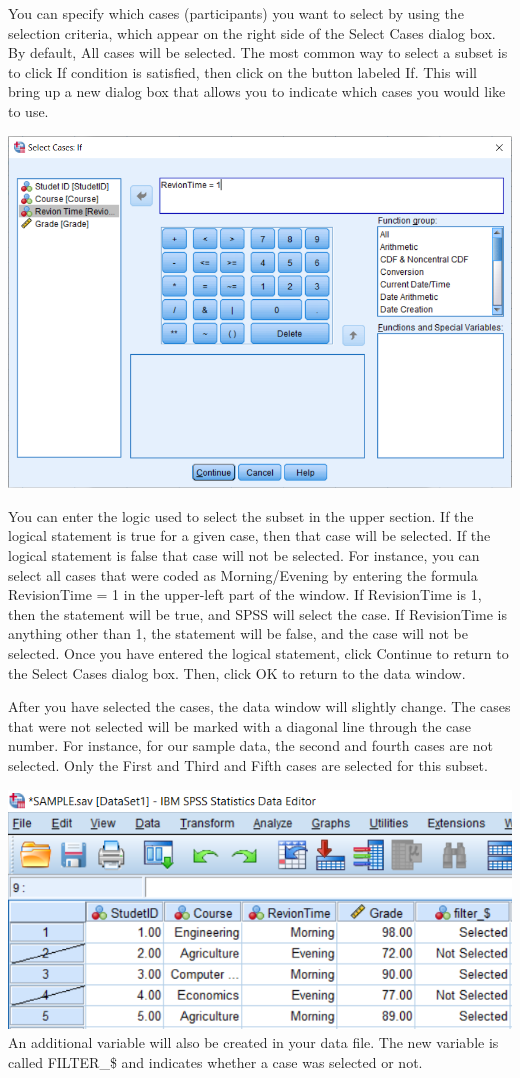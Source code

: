 \documentclass[
]{book}
\begin{document}
You can specify which cases (participants) you want to select by using the selection criteria, which appear on the right side of the Select Cases dialog box. By default, All cases will be selected. The most common way to select a subset is to click If condition is satisfied, then click on the button labeled If. This will bring up a new dialog box that allows you to indicate which cases you would like to use.

\includegraphics{SelectCases3.png}

You can enter the logic used to select the subset in the upper section. If the logical statement is true for a given case, then that case will be selected. If the logical statement is false that case will not be selected. For instance, you can select all cases that were coded as Morning/Evening by entering the formula RevisionTime = 1 in the upper-left part of the window. If RevisionTime is 1, then the statement will be true, and SPSS will select the case. If RevisionTime is anything other than 1, the statement will be false, and the case will not be selected. Once you have entered the logical statement, click Continue to return to the Select Cases dialog box. Then, click OK to return to the data window.

After you have selected the cases, the data window will slightly change. The cases that were not selected will be marked with a diagonal line through the case number. For instance, for our sample data, the second and fourth cases are not selected. Only the First and Third and Fifth cases are selected for this subset.

\includegraphics{Exclude1.png}
An additional variable will also be created in your data file. The new variable is called FILTER\_\$ and indicates whether a case was selected or not.
\end{document}
